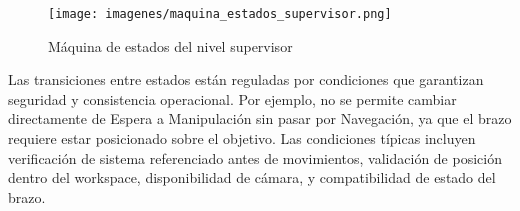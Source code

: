 \begin{figure}[H]
    \centering
    \texttt{[image: imagenes/maquina\_estados\_supervisor.png]}
    \caption{Máquina de estados del nivel supervisor}
    \label{fig:maquina_estados_supervisor}
\end{figure}

Las transiciones entre estados están reguladas por condiciones que garantizan seguridad y consistencia operacional. Por ejemplo, no se permite cambiar directamente de Espera a Manipulación sin pasar por Navegación, ya que el brazo requiere estar posicionado sobre el objetivo. Las condiciones típicas incluyen verificación de sistema referenciado antes de movimientos, validación de posición dentro del workspace, disponibilidad de cámara, y compatibilidad de estado del brazo.